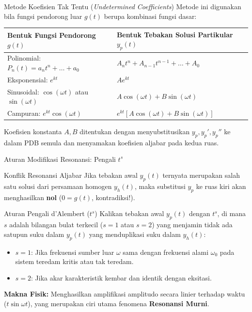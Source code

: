 \documentclass[aspectratio=169,10pt]{beamer}
\begin{document}
\begin{frame}{Metode Koefisien Tak Tentu (\textit{Undetermined Coefficients})}
  Metode ini digunakan bila fungsi pendorong luar $g(t)$ berupa kombinasi fungsi dasar:
  \vspace{0.15cm}
  \begin{center}
    \small
    \begin{tabular}{ll}
      \toprule
      \textbf{Bentuk Fungsi Pendorong $g(t)$} & \textbf{Bentuk Tebakan Solusi Partikular $y_p(t)$} \\ \midrule
      Polinomial: $P_n(t) = a_n t^n + \dots + a_0$ & $A_n t^n + A_{n-1} t^{n-1} + \dots + A_0$ \\
      Eksponensial: $e^{k t}$ & $A e^{k t}$ \\
      Sinusoidal: $\cos(\omega t)$ atau $\sin(\omega t)$ & $A \cos(\omega t) + B \sin(\omega t)$ \\
      Campuran: $e^{k t} \cos(\omega t)$ & $e^{k t} [A \cos(\omega t) + B \sin(\omega t)]$ \\ \bottomrule
    \end{tabular}
  \end{center}
  \vspace{0.2cm}
  \footnotesize Koefisien konstanta $A, B$ ditentukan dengan menyubstitusikan $y_p, y_p', y_p''$ ke dalam PDB semula dan menyamakan koefisien aljabar pada kedua ruas.
\end{frame}

\begin{frame}{Aturan Modifikasi Resonansi: Pengali $t^s$}
  \begin{alertblock}{Konflik Resonansi Aljabar}
    Jika tebakan awal $y_p(t)$ ternyata merupakan salah satu solusi dari persamaan homogen $y_h(t)$, maka substitusi $y_p$ ke ruas kiri akan menghasilkan \textbf{nol} ($0 = g(t)$, kontradiksi!).
  \end{alertblock}
  \vspace{0.15cm}
  \begin{block}{Aturan Pengali d'Alembert ($t^s$)}
    Kalikan tebakan awal $y_p(t)$ dengan $t^s$, di mana $s$ adalah bilangan bulat terkecil ($s=1$ atau $s=2$) yang menjamin tidak ada satupun suku dalam $y_p(t)$ yang menduplikasi suku dalam $y_h(t)$:
    \begin{itemize}
      \item $s = 1$: Jika frekuensi sumber luar $\omega$ sama dengan frekuensi alami $\omega_0$ pada sistem teredam kritis atau tak teredam.
      \item $s = 2$: Jika akar karakteristik kembar dan identik dengan eksitasi.
    \end{itemize}
    \textbf{Makna Fisik:} Menghasilkan amplifikasi amplitudo secara linier terhadap waktu ($t \sin\omega t$), yang merupakan ciri utama fenomena \textbf{Resonansi Murni}.
  \end{block}
\end{frame}
\end{document}
